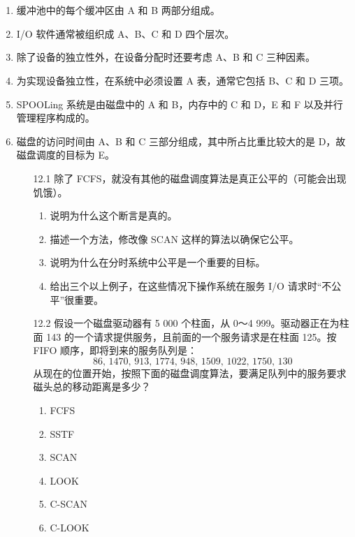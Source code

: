 \documentclass[UTF8]{ctexart}
\begin{document}
\section{}
\begin{enumerate}
	\item 缓冲池中的每个缓冲区由 A 和 B 两部分组成。
	
	\item I/O 软件通常被组织成 A、B、C 和 D 四个层次。
	
	\item 除了设备的独立性外，在设备分配时还要考虑 A、B 和 C 三种因素。
	
	\item 为实现设备独立性，在系统中必须设置 A 表，通常它包括 B、C 和 D 三项。
	
	\item SPOOLing 系统是由磁盘中的 A 和 B，内存中的 C 和 D，E 和 F 以及并行管理程序构成的。
	
	\item 磁盘的访问时间由 A、B 和 C 三部分组成，其中所占比重比较大的是 D，故磁盘调度的目标为 E。
	
	\begin{enumerate}
		\item[12.1] 除了 FCFS，就没有其他的磁盘调度算法是真正公平的（可能会出现饥饿）。
		\begin{enumerate}
			\item 说明为什么这个断言是真的。
			\item 描述一个方法，修改像 SCAN 这样的算法以确保它公平。
			\item 说明为什么在分时系统中公平是一个重要的目标。
			\item 给出三个以上例子，在这些情况下操作系统在服务 I/O 请求时“不公平”很重要。
		\end{enumerate}
		
		\item[12.2] 假设一个磁盘驱动器有 5 000 个柱面，从 0～4 999。驱动器正在为柱面 143 的一个请求提供服务，且前面的一个服务请求是在柱面 125。按 FIFO 顺序，即将到来的服务队列是：
		\[
		86, \, 1470, \, 913, \, 1774, \, 948, \, 1509, \, 1022, \, 1750, \, 130
		\]
		从现在的位置开始，按照下面的磁盘调度算法，要满足队列中的服务要求磁头总的移动距离是多少？
		\begin{enumerate}
			\item FCFS
			\item SSTF
			\item SCAN
			\item LOOK
			\item C-SCAN
			\item C-LOOK
		\end{enumerate}
		

\end{enumerate}
\end{enumerate}
\end{document}

